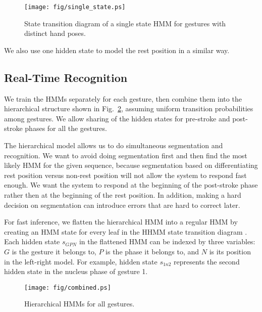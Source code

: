\begin{figure}[t]
\centering
\texttt{[image: fig/single\_state.ps]}
\caption{State transition diagram of a single state HMM for gestures with
distinct hand poses. }
\label{fig:single}
\end{figure}

We also use one hidden state to model the rest position in a similar way.


\subsection{Real-Time Recognition}
We train the HMMs separately for each gesture, then combine them into the
hierarchical structure shown in Fig.~\ref{fig:combined}, assuming uniform
transition probabilities among gestures.
We allow sharing of the hidden states for pre-stroke and post-stroke phases for all the gestures. 

The hierarchical model allows us to do simultaneous segmentation and
recognition. We want to avoid doing segmentation first and then find the most
likely HMM for the given sequence, because segmentation based on
differentiating rest position versus non-rest position will not allow the system
to respond fast enough. We want the system to respond at the beginning of the
post-stroke phase rather then at the beginning of the rest position. In
addition, making a hard decision on segmentation can introduce errors that
are hard to correct later. 

For fast inference, we
flatten the hierarchical HMM into a regular HMM by creating an HMM state for
every leaf in the HHMM state transition diagram \cite{murphy02}. Each
hidden state $s_{GPN}$ in the flattened HMM can be indexed by three variables:
$G$ is the gesture it belongs to, $P$ is the phase it belongs to, and $N$ is its
position in the left-right model. For example, hidden state $s_{1n2}$ represents the
second hidden state in the nucleus phase of gesture 1.

\begin{figure}[t]
\centering
\texttt{[image: fig/combined.ps]}
\caption{Hierarchical HMMs for all gestures.}
\label{fig:combined}
\end{figure}

